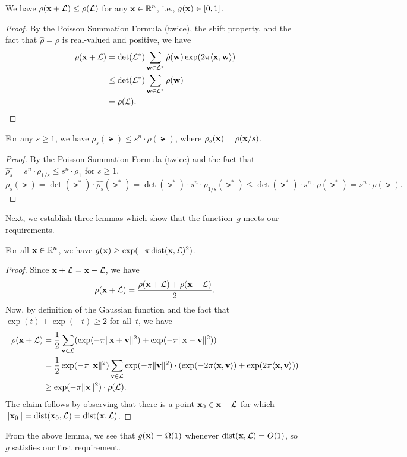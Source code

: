 \documentclass[11pt]{article}
\begin{document}
\begin{claim}
  \label{clm:gaussian-shift}
  We have $\rho(\mathbf{x} + \mathcal{L}) \leq \rho(\mathcal{L})$ for any $\mathbf{x} \in
  \mathbb{R}^n$, i.e., $g(\mathbf{x}) \in [0,1]$.
\end{claim}

\begin{proof}
  By the Poisson Summation Formula (twice), the shift property, and
  the fact that $\hat{\rho} = \rho$ is real-valued and positive, we
  have
  \begin{align*}
    \rho(\mathbf{x} + \mathcal{L})
    &= \det(\mathcal{L}^*) \sum_{\mathbf{w} \in \mathcal{L}^*} \hat{\rho}(\mathbf{w})\exp(2 \pi \langle\mathbf{x},\mathbf{w}\rangle ) \\
    &\leq \det(\mathcal{L}^*)\sum_{\mathbf{w} \in \mathcal{L}^*} \rho(\mathbf{w}) \\
    &=  \rho(\mathcal{L}).
  \end{align*}
\end{proof}

\begin{claim}
  \label{clm:gaussian-scale}
  For any $s \geq 1$, we have
  $\rho_s(\lat) \leq s^{n} \cdot \rho(\lat)$, where
  $\rho_s(\mathbf{x}) = \rho(\mathbf{x}/s)$.
\end{claim}

\begin{proof}
  By the Poisson Summation Formula (twice) and the fact that
  $\widehat{\rho_{s}} = s^{n} \cdot \rho_{1/s} \leq s^{n} \cdot
  \rho_{1}$ for $s \geq 1$,
  \[ \rho_s(\lat) = \det(\lat^*) \cdot \widehat{\rho_{s}}(\lat^*) =
    \det(\lat^{*}) \cdot s^{n} \cdot \rho_{1/s}(\lat^{*}) \leq
    \det(\lat^{*}) \cdot s^{n} \cdot \rho(\lat^{*}) = s^{n} \cdot
    \rho(\lat). \]
\end{proof}

\noindent Next, we establish three lemmas which show that the
function~$g$ meets our requirements.

\begin{lemma}
  For all $\mathbf{x} \in \mathbb{R}^{n}$, we have
  $g(\mathbf{x}) \geq \exp(-\pi \operatorname{dist}(\mathbf{x},\mathcal{L})^2)$.
\end{lemma}

\begin{proof}
  Since $\mathbf{x}+\mathcal{L} = \mathbf{x}-\mathcal{L}$, we have
  \[ \rho(\mathbf{x}+\mathcal{L}) = \frac{\rho(\mathbf{x}+\mathcal{L}) +
      \rho(\mathbf{x}-\mathcal{L})}{2}. \] Now, by definition of the Gaussian
  function and the fact that $\exp(t) + \exp(-t) \geq 2$ for all~$t$,
  we have
  \begin{align*}
    \rho(\mathbf{x}+\mathcal{L})
    &= \frac12 \sum_{\mathbf{v} \in \mathcal{L}} ( \exp(-\pi \lVert\mathbf{x}+\mathbf{v}\rVert^2)+ \exp(-\pi \lVert\mathbf{x}-\mathbf{v}\rVert^2)) \\
    &= \frac12 \exp(-\pi \lVert\mathbf{x}\rVert^2)
      \sum_{\mathbf{v} \in \mathcal{L}} \exp(-\pi \lVert\mathbf{v}\rVert^2) \cdot
      (\exp(-2\pi \langle\mathbf{x},\mathbf{v}\rangle)+\exp(2\pi \langle\mathbf{x},\mathbf{v}\rangle)) \\
    &\geq \exp(-\pi \lVert\mathbf{x}\rVert^{2}) \cdot \rho(\mathcal{L}) .
  \end{align*}
  The claim follows by observing that there is a point
  $\mathbf{x}_0 \in \mathbf{x} + \mathcal{L}$ for which
  $\lVert\mathbf{x}_0\rVert=\operatorname{dist}(\mathbf{x}_0,\mathcal{L}) = \operatorname{dist}(\mathbf{x},\mathcal{L})$.
\end{proof}
From the above lemma, we see that $g(\mathbf{x}) = \Omega(1)$ whenever
$\operatorname{dist}(\mathbf{x},\mathcal{L}) = O(1)$, so~$g$ satisfies our first requirement.
\end{document}
